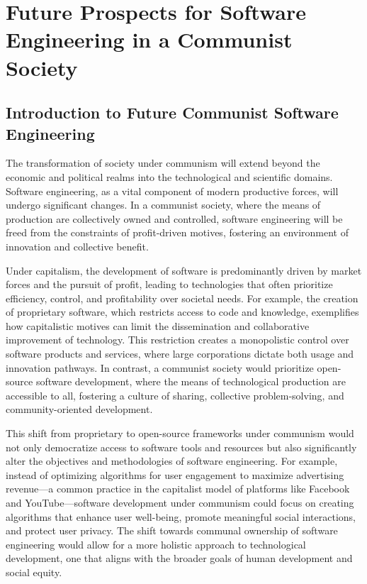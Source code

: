 \chapter{Future Prospects for Software Engineering in a Communist Society}

\section{Introduction to Future Communist Software Engineering}

The transformation of society under communism will extend beyond the economic and political realms into the technological and scientific domains. Software engineering, as a vital component of modern productive forces, will undergo significant changes. In a communist society, where the means of production are collectively owned and controlled, software engineering will be freed from the constraints of profit-driven motives, fostering an environment of innovation and collective benefit.

Under capitalism, the development of software is predominantly driven by market forces and the pursuit of profit, leading to technologies that often prioritize efficiency, control, and profitability over societal needs. For example, the creation of proprietary software, which restricts access to code and knowledge, exemplifies how capitalistic motives can limit the dissemination and collaborative improvement of technology. This restriction creates a monopolistic control over software products and services, where large corporations dictate both usage and innovation pathways. In contrast, a communist society would prioritize open-source software development, where the means of technological production are accessible to all, fostering a culture of sharing, collective problem-solving, and community-oriented development.

This shift from proprietary to open-source frameworks under communism would not only democratize access to software tools and resources but also significantly alter the objectives and methodologies of software engineering. For example, instead of optimizing algorithms for user engagement to maximize advertising revenue—a common practice in the capitalist model of platforms like Facebook and YouTube—software development under communism could focus on creating algorithms that enhance user well-being, promote meaningful social interactions, and protect user privacy. The shift towards communal ownership of software engineering would allow for a more holistic approach to technological development, one that aligns with the broader goals of human development and social equity.


